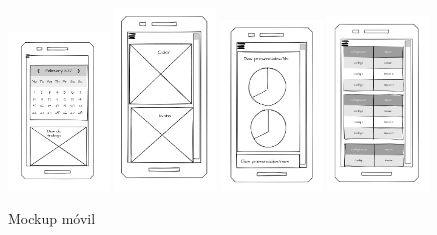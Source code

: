 \documentclass[11pt,spanish,listoffigures,listoftables]{tfgetsinf}
\begin{document}
 \begin{figure}[ht!] %
  \includegraphics[width=0.24\textwidth]{img/Vista_Calendario_MVL.png}
  \includegraphics[width=0.24\textwidth]{img/Vista_Opciones_MVL.png}
  \includegraphics[width=0.24\textwidth]{img/Vista_Informes_MVL.png}
  \includegraphics[width=0.24\textwidth]{img/Vista_Administracion_MVL.png}
  \caption{Mockup móvil}
  \label{fig:VistaMVL}
\end{figure}
\end{document}
